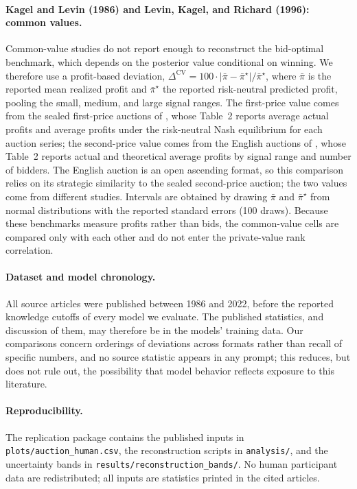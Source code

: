 \documentclass[acmsmall,screen,review]{acmart}
\newenvironment{revblock}{\color{blue}}{}
\newenvironment{revblock}{}{}
\begin{document}
\begin{revblock}
\paragraph{Kagel and Levin (1986) and Levin, Kagel, and Richard (1996): common values.}
Common-value studies do not report enough to reconstruct the bid-optimal benchmark, which depends on the posterior value conditional on winning. We therefore use a profit-based deviation, $\Delta^{\mathrm{CV}}=100\cdot|\bar\pi-\bar\pi^\star|/\bar\pi^\star$, where $\bar\pi$ is the reported mean realized profit and $\bar\pi^\star$ the reported risk-neutral predicted profit, pooling the small, medium, and large signal ranges. The first-price value comes from the sealed first-price auctions of \citet{kagel1986winner}, whose Table~2 reports average actual profits and average profits under the risk-neutral Nash equilibrium for each auction series; the second-price value comes from the English auctions of \citet{levin1996revenue}, whose Table~2 reports actual and theoretical average profits by signal range and number of bidders. The English auction is an open ascending format, so this comparison relies on its strategic similarity to the sealed second-price auction; the two values come from different studies. Intervals are obtained by drawing $\bar\pi$ and $\bar\pi^\star$ from normal distributions with the reported standard errors (100 draws). Because these benchmarks measure profits rather than bids, the common-value cells are compared only with each other and do not enter the private-value rank correlation.

\paragraph{Dataset and model chronology.}
All source articles were published between 1986 and 2022, before the reported knowledge cutoffs of every model we evaluate. The published statistics, and discussion of them, may therefore be in the models' training data. Our comparisons concern orderings of deviations across formats rather than recall of specific numbers, and no source statistic appears in any prompt; this reduces, but does not rule out, the possibility that model behavior reflects exposure to this literature.

\paragraph{Reproducibility.}
The replication package contains the published inputs in \texttt{plots/auction\_human.csv}, the reconstruction scripts in \texttt{analysis/}, and the uncertainty bands in \texttt{results/reconstruction\_bands/}. No human participant data are redistributed; all inputs are statistics printed in the cited articles.



\end{revblock}
\end{document}
